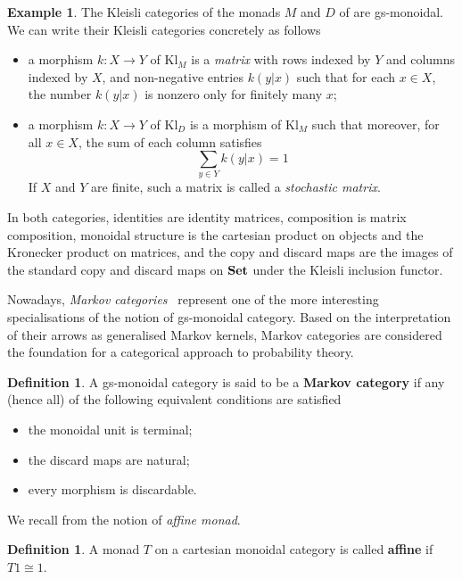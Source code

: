 \documentclass[a4paper,UKenglish,numberwithinsect,cleveref, autoref, thm-restate]{lipics-v2021}
\theoremstyle{plain} %
\theoremstyle{definition} %
\newtheorem{mydefinition}[mytheorem]{Definition}
\newtheorem{myexample}[mytheorem]{Example}
\begin{document}
\begin{myexample}\label{kleisliM}
 The Kleisli categories of the monads $M$ and $D$ of  are gs-monoidal. We can write their Kleisli categories concretely as follows
 \begin{itemize}
  \item a morphism $k:X\to Y$ of $\mathrm{Kl}_M$ is a \emph{matrix} with rows indexed by $Y$ and columns indexed by $X$, and non-negative entries $k(y|x)$ such that for each $x\in X$, the number $k(y|x)$ is nonzero only for finitely many $x$;
  \item a morphism $k:X\to Y$ of $\mathrm{Kl}_D$ is a morphism of $\mathrm{Kl}_M$ such that moreover, for all $x\in X$, the sum of each column satisfies
  \[
   \sum_{y\in Y} k(y|x) = 1 %
  \]
  If $X$ and $Y$ are finite, such a matrix is called a \emph{stochastic matrix}.
 \end{itemize}
 In both categories, identities are identity matrices, composition is matrix composition, monoidal structure is the cartesian product on objects and the Kronecker product on matrices, and the copy and discard maps are the images of the standard copy and discard maps on $\mathbf{Set}$ under the Kleisli inclusion functor.
\end{myexample}

Nowadays, \emph{Markov categories}~\cite{Fritz_2020} represent one of the more interesting specialisations of the notion of gs-monoidal category. Based on the interpretation of their arrows
 as generalised Markov kernels, Markov categories are considered the foundation for a categorical approach to probability theory.

\begin{mydefinition}
 A gs-monoidal category is said to be a \textbf{Markov category} if any (hence all) of the following equivalent conditions are satisfied
 \begin{itemize}
  \item the monoidal unit is terminal;
  \item the discard maps are natural;
  \item every morphism is discardable.
 \end{itemize}
\end{mydefinition}

We recall from \cite{Kock71,Jacobs1994} the notion of \emph{affine monad}.

\begin{mydefinition}
 A monad $T$ on a cartesian monoidal category is called \textbf{affine} if $T1\cong 1$.
\end{mydefinition}
\end{document}
